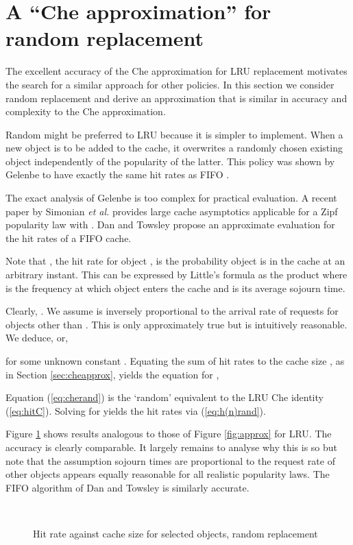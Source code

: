 \documentclass{amsart}
\def\etal{{\em et al. }}
\begin{document}
\section{A ``Che approximation'' for random replacement}
\label{sec:randomche}
The excellent accuracy of the Che approximation for LRU replacement motivates the search for a similar approach for other policies. In this section we consider random replacement and derive an approximation that is similar in accuracy and complexity to the Che approximation.

Random might be preferred to LRU because it is simpler to implement. When a new object is to be added to the cache, it overwrites a randomly chosen existing object independently of the popularity of the latter. This policy was shown by Gelenbe to have exactly the same hit rates as FIFO  \cite{Gelebe73}.  

The exact analysis of Gelenbe is too complex for practical evaluation. A recent paper by Simonian \etal \cite{KS12} provides large cache asymptotics applicable for a Zipf popularity law with . Dan and Towsley  \cite{DT90} propose an approximate evaluation for the hit rates of a FIFO cache.  

Note that , the hit rate for object , is the probability object  is in the cache at an arbitrary instant. This can be expressed by Little's formula as the product  where  is the frequency at which object  enters the cache and  is its average sojourn time. 

Clearly, .  We assume  is inversely proportional to the arrival rate of requests for objects other than . This is only approximately true but is intuitively reasonable. We deduce,  or,

 for some unknown constant . Equating the sum of hit rates to the cache size , as in Section \ref{sec:cheapprox}, yields the equation for ,

 Equation (\ref{eq:cherand}) is the `random' equivalent to the LRU Che identity (\ref{eq:hitC}). Solving for  yields the hit rates via (\ref{eq:h(n)rand}).

 
Figure \ref{fig:rand-approx} shows results analogous to those of Figure \ref{fig:approx} for LRU. The accuracy is  clearly comparable. It largely remains to analyse why this is so but note that the assumption sojourn times are proportional to the request rate of other objects appears equally reasonable for all realistic popularity laws. The FIFO algorithm of Dan and Towsley \cite{DT90} is similarly accurate. 
 
\begin{figure}
 \\
\hspace{-15mm}     
   \caption{Hit rate against cache size for selected objects, random replacement}
  \label{fig:rand-approx}
\end{figure}
\end{document}
